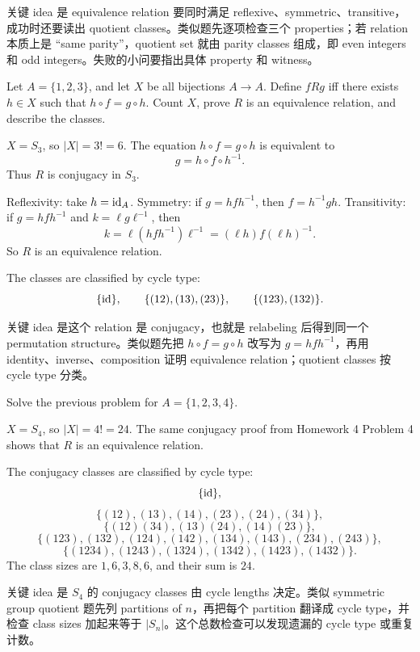 \begin{explanation}
关键 idea 是 equivalence relation 要同时满足 reflexive、symmetric、transitive，成功时还要读出 quotient classes。类似题先逐项检查三个 properties；若 relation 本质上是 ``same parity''，quotient set 就由 parity classes 组成，即 even integers 和 odd integers。失败的小问要指出具体 property 和 witness。
\end{explanation}

\begin{exerciseblock}
Let \(A=\{1,2,3\}\), and let \(X\) be all bijections \(A\to A\). Define \(fRg\) iff there exists \(h\in X\) such that \(h\circ f=g\circ h\). Count \(X\), prove \(R\) is an equivalence relation, and describe the classes.
\end{exerciseblock}

\begin{solution}
\(X=S_3\), so \(|X|=3!=6\). The equation \(h\circ f=g\circ h\) is equivalent to
\[
g=h\circ f\circ h^{-1}.
\]
Thus \(R\) is conjugacy in \(S_3\).

Reflexivity: take \(h=\mathrm{id}_A\). Symmetry: if \(g=hfh^{-1}\), then \(f=h^{-1}gh\). Transitivity: if \(g=hfh^{-1}\) and \(k=\ell g\ell^{-1}\), then
\[
k=\ell(hfh^{-1})\ell^{-1}=(\ell h)f(\ell h)^{-1}.
\]
So \(R\) is an equivalence relation.

The classes are classified by cycle type:
\[
\{\mathrm{id}\},\qquad \{(12),(13),(23)\},\qquad \{(123),(132)\}.
\]
\end{solution}

\begin{explanation}
关键 idea 是这个 relation 是 conjugacy，也就是 relabeling 后得到同一个 permutation structure。类似题先把 \(h\circ f=g\circ h\) 改写为 \(g=hfh^{-1}\)，再用 identity、inverse、composition 证明 equivalence relation；quotient classes 按 cycle type 分类。
\end{explanation}

\begin{exerciseblock}
Solve the previous problem for \(A=\{1,2,3,4\}\).
\end{exerciseblock}

\begin{solution}
\(X=S_4\), so \(|X|=4!=24\). The same conjugacy proof from Homework 4 Problem 4 shows that \(R\) is an equivalence relation.

The conjugacy classes are classified by cycle type:
\[
\{\mathrm{id}\},
\]
\[
\{(12),(13),(14),(23),(24),(34)\},
\]
\[
\{(12)(34),(13)(24),(14)(23)\},
\]
\[
\{(123),(132),(124),(142),(134),(143),(234),(243)\},
\]
\[
\{(1234),(1243),(1324),(1342),(1423),(1432)\}.
\]
The class sizes are \(1,6,3,8,6\), and their sum is \(24\).
\end{solution}

\begin{explanation}
关键 idea 是 \(S_4\) 的 conjugacy classes 由 cycle lengths 决定。类似 symmetric group quotient 题先列 partitions of \(n\)，再把每个 partition 翻译成 cycle type，并检查 class sizes 加起来等于 \(|S_n|\)。这个总数检查可以发现遗漏的 cycle type 或重复计数。
\end{explanation}
